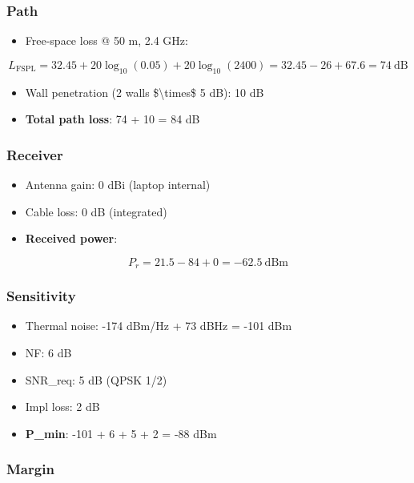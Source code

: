 \subsubsection{Path}\label{path}

\begin{itemize}
\tightlist
\item
  Free-space loss @ 50 m, 2.4 GHz:
\end{itemize}

\[
L_{\text{FSPL}} = 32.45 + 20\log_{10}(0.05) + 20\log_{10}(2400) = 32.45 - 26 + 67.6 = 74\ \text{dB}
\]

\begin{itemize}
\tightlist
\item
  Wall penetration (2 walls \$\textbackslash times\$ 5 dB): 10 dB
\item
  \textbf{Total path loss}: 74 + 10 = 84 dB
\end{itemize}

\subsubsection{Receiver}\label{receiver}

\begin{itemize}
\tightlist
\item
  Antenna gain: 0 dBi (laptop internal)
\item
  Cable loss: 0 dB (integrated)
\item
  \textbf{Received power}:
\end{itemize}

\[
P_r = 21.5 - 84 + 0 = -62.5\ \text{dBm}
\]

\subsubsection{Sensitivity}\label{sensitivity}

\begin{itemize}
\tightlist
\item
  Thermal noise: -174 dBm/Hz + 73 dBHz = -101 dBm
\item
  NF: 6 dB
\item
  SNR\_req: 5 dB (QPSK 1/2)
\item
  Impl loss: 2 dB
\item
  \textbf{P\_min}: -101 + 6 + 5 + 2 = -88 dBm
\end{itemize}

\subsubsection{Margin}\label{margin}

